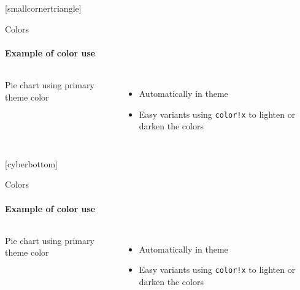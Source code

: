 \documentclass[aspectratio=169]{beamer}
\begin{document}
{
  [smallcornertriangle]
  \begin{frame}{Colors}
    \framesubtitle{Example of color use}
    \begin{columns}[c, onlytextwidth]
      Pie chart using primary theme color
      \begin{itemize}
        \item Automatically in theme
        \item Easy variants using \texttt{color!x} to lighten or darken the colors
      \end{itemize}
      \hfill
      \center
    \end{columns}
  \end{frame}
}

{
  [cyberbottom]
  \begin{frame}{Colors}
    \framesubtitle{Example of color use}
    \begin{columns}[c, onlytextwidth]
      Pie chart using primary theme color
      \begin{itemize}
        \item Automatically in theme
        \item Easy variants using \texttt{color!x} to lighten or darken the colors
      \end{itemize}
      \hfill
      \center
    \end{columns}
  \end{frame}
}
\end{document}
